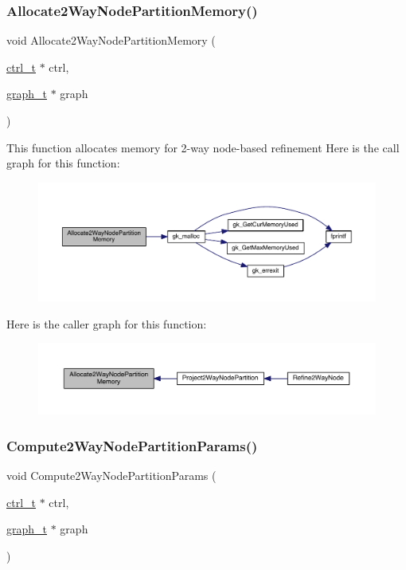 \subsubsection{\texorpdfstring{Allocate2\+Way\+Node\+Partition\+Memory()}{Allocate2WayNodePartitionMemory()}}
{\footnotesize\ttfamily void Allocate2\+Way\+Node\+Partition\+Memory (\begin{DoxyParamCaption}\item[{\hyperlink{a00742}{ctrl\+\_\+t} $\ast$}]{ctrl,  }\item[{\hyperlink{a00734}{graph\+\_\+t} $\ast$}]{graph }\end{DoxyParamCaption})}

This function allocates memory for 2-\/way node-\/based refinement Here is the call graph for this function\+:\nopagebreak
\begin{figure}[H]
\begin{center}
\leavevmode
\includegraphics[width=350pt]{a00278_a843a5692564dc695b281647dc690c887_cgraph}
\end{center}
\end{figure}
Here is the caller graph for this function\+:\nopagebreak
\begin{figure}[H]
\begin{center}
\leavevmode
\includegraphics[width=350pt]{a00278_a843a5692564dc695b281647dc690c887_icgraph}
\end{center}
\end{figure}
\mbox{\label{a00278_a66257f7c528ad75c86244ef3794d1ae5}} 
\subsubsection{\texorpdfstring{Compute2\+Way\+Node\+Partition\+Params()}{Compute2WayNodePartitionParams()}}
{\footnotesize\ttfamily void Compute2\+Way\+Node\+Partition\+Params (\begin{DoxyParamCaption}\item[{\hyperlink{a00742}{ctrl\+\_\+t} $\ast$}]{ctrl,  }\item[{\hyperlink{a00734}{graph\+\_\+t} $\ast$}]{graph }\end{DoxyParamCaption})}

